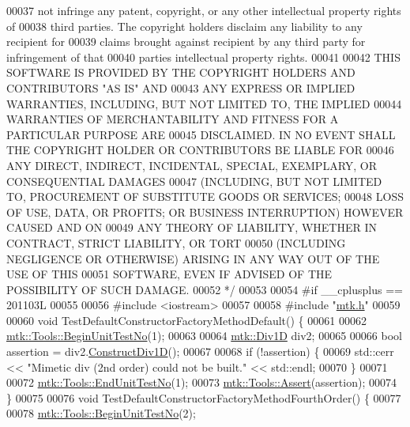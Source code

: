 \begin{DoxyCode}
00037 \textcolor{comment}{not infringe any patent, copyright, or any other intellectual property rights of}
00038 \textcolor{comment}{third parties. The copyright holders disclaim any liability to any recipient for}
00039 \textcolor{comment}{claims brought against recipient by any third party for infringement of that}
00040 \textcolor{comment}{parties intellectual property rights.}
00041 \textcolor{comment}{}
00042 \textcolor{comment}{THIS SOFTWARE IS PROVIDED BY THE COPYRIGHT HOLDERS AND CONTRIBUTORS "AS IS" AND}
00043 \textcolor{comment}{ANY EXPRESS OR IMPLIED WARRANTIES, INCLUDING, BUT NOT LIMITED TO, THE IMPLIED}
00044 \textcolor{comment}{WARRANTIES OF MERCHANTABILITY AND FITNESS FOR A PARTICULAR PURPOSE ARE}
00045 \textcolor{comment}{DISCLAIMED. IN NO EVENT SHALL THE COPYRIGHT HOLDER OR CONTRIBUTORS BE LIABLE FOR}
00046 \textcolor{comment}{ANY DIRECT, INDIRECT, INCIDENTAL, SPECIAL, EXEMPLARY, OR CONSEQUENTIAL DAMAGES}
00047 \textcolor{comment}{(INCLUDING, BUT NOT LIMITED TO, PROCUREMENT OF SUBSTITUTE GOODS OR SERVICES;}
00048 \textcolor{comment}{LOSS OF USE, DATA, OR PROFITS; OR BUSINESS INTERRUPTION) HOWEVER CAUSED AND ON}
00049 \textcolor{comment}{ANY THEORY OF LIABILITY, WHETHER IN CONTRACT, STRICT LIABILITY, OR TORT}
00050 \textcolor{comment}{(INCLUDING NEGLIGENCE OR OTHERWISE) ARISING IN ANY WAY OUT OF THE USE OF THIS}
00051 \textcolor{comment}{SOFTWARE, EVEN IF ADVISED OF THE POSSIBILITY OF SUCH DAMAGE.}
00052 \textcolor{comment}{*/}
00053 
00054 \textcolor{preprocessor}{#if \_\_cplusplus == 201103L}
00055 
00056 \textcolor{preprocessor}{#include <iostream>}
00057 
00058 \textcolor{preprocessor}{#include "\hyperlink{mtk_8h}{mtk.h}"}
00059 
00060 \textcolor{keywordtype}{void} TestDefaultConstructorFactoryMethodDefault() \{
00061 
00062   \hyperlink{classmtk_1_1Tools_a26ee906d28523378522a75e25c3a4e19}{mtk::Tools::BeginUnitTestNo}(1);
00063 
00064   \hyperlink{classmtk_1_1Div1D}{mtk::Div1D} div2;
00065 
00066   \textcolor{keywordtype}{bool} assertion = div2.\hyperlink{classmtk_1_1Div1D_a52fcd1542f11e606e36bd188e48bfdf7}{ConstructDiv1D}();
00067 
00068   \textcolor{keywordflow}{if} (!assertion) \{
00069     std::cerr << \textcolor{stringliteral}{"Mimetic div (2nd order) could not be built."} << std::endl;
00070   \}
00071 
00072   \hyperlink{classmtk_1_1Tools_ad8cf0085133dd40c913fe195bc5b9694}{mtk::Tools::EndUnitTestNo}(1);
00073   \hyperlink{classmtk_1_1Tools_aa311fada9255627d06c56b1e4fedce9e}{mtk::Tools::Assert}(assertion);
00074 \}
00075 
00076 \textcolor{keywordtype}{void} TestDefaultConstructorFactoryMethodFourthOrder() \{
00077 
00078   \hyperlink{classmtk_1_1Tools_a26ee906d28523378522a75e25c3a4e19}{mtk::Tools::BeginUnitTestNo}(2);

\end{DoxyCode}
